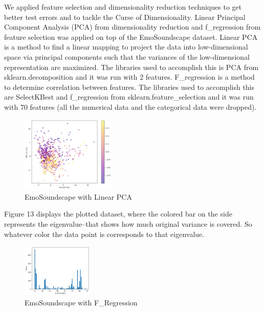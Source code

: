 \documentclass[conference]{IEEEtran}
\begin{document}
\noindent
We applied feature selection and dimensionality reduction techniques to get better test errors and to tackle the Curse of Dimensionality. Linear Principal Component Analysis (PCA) from dimensionality reduction and f\_regression from feature selection was applied on top of the EmoSoundscape dataset. Linear PCA is a method to find a linear mapping to project the data into low-dimensional space via principal components such that the variances of the low-dimensional representation are maximized. The libraries used to accomplish this is PCA from sklearn.decomposition and it was run with 2 features. F\_regression is a method to determine correlation between features. The libraries used to accomplish this are SelectKBest and f\_regression from sklearn.feature\_selection and it was run with 70 features (all the numerical data and the categorical data were dropped).\\

\begin{figure}[h]
\caption{EmoSoundscape with Linear PCA}
\centering
\includegraphics[width=0.4\textwidth]{Figures/emosound_pca.png}
\end{figure}

\FloatBarrier

\noindent
Figure 13 displays the plotted dataset, where the colored bar on the side represents the eigenvalue--that shows how much original variance is covered. So whatever color the data point is corresponds to that eigenvalue. \\

\begin{figure}[h]
\caption{EmoSoundscape with F\_Regression}
\centering
\includegraphics[width=0.3\textwidth]{Figures/emosound_f_reg.png}
\end{figure}
\end{document}
